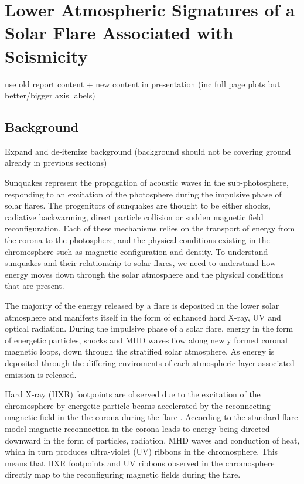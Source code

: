 \section{Lower Atmospheric Signatures of a Solar Flare Associated with Seismicity}
use old report content + new content in presentation (inc full page plots but better/bigger axis labels)



\subsection{Background} 
Expand and de-itemize background (background should not be covering ground already in previous sections)


Sunquakes represent the propagation of acoustic waves in the sub-photosphere, responding to an excitation of the photosphere during the impulsive phase of solar flares. The progenitors of sunquakes are thought to be either shocks, radiative backwarming, direct particle collision or sudden magnetic field reconfiguration. Each of these mechanisms relies on the transport of energy from the corona to the photosphere, and the physical conditions existing in the chromosphere such as magnetic configuration and density. To understand sunquakes and their relationship to solar flares, we need to understand how energy moves down through the solar atmosphere and the physical conditions that are present. 

The majority of the energy released by a flare is deposited in the lower solar atmosphere and manifests itself in the form of enhanced hard X-ray, UV and optical radiation. During the impulsive phase of a solar flare, energy in the form of energetic particles, shocks and MHD waves flow along newly formed coronal magnetic loops, down through the stratified solar atmosphere. As energy is deposited through the differing enviroments of each atmospheric layer associated emission is released. 

Hard X-ray (HXR) footpoints are observed due to the excitation of the chromosphere by energetic particle beams accelerated by the reconnecting magnetic field in the the corona during the flare \citep{1995ApJ...455..347A}. According to the standard flare model \citep{1964NASSP..50..451C, 1966Natur.211..695S, 1974SoPh...34..323H, 1976SoPh...50...85K} magnetic reconnection in the corona leads to energy being directed downward in the form of particles, radiation, MHD waves and conduction of heat, which in turn produces ultra-violet (UV) ribbons in the chromosphere. This means that HXR footpoints and UV ribbons observed in the chromosphere directly map to the reconfiguring magnetic fields during the flare. 

